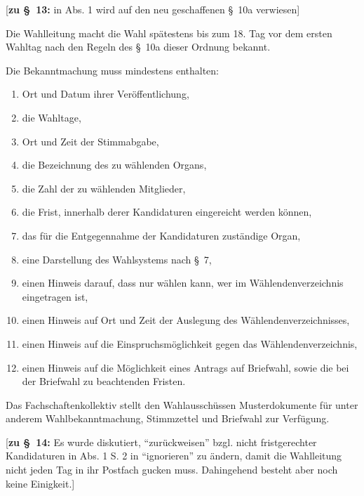 \documentclass[%
draft,%
multilinesections%
]{fswo}
\newcommand\bemFr[1] {{\color{Red}[#1]}}
\newcommand\bemFr[1]{}%
\begin{document}
\bemFr{\textbf{zu \S~13:} in Abs. 1 wird auf den neu geschaffenen \S~10a verwiesen}
\begin{contract}
Die Wahlleitung macht die Wahl spätestens bis zum 18. Tag vor dem ersten Wahltag nach den Regeln des \S~10a dieser Ordnung bekannt.

Die Bekanntmachung muss mindestens enthalten:
\begin{enumerate}
\item Ort und Datum ihrer Veröffentlichung,
\item die Wahltage,
\item Ort und Zeit der Stimmabgabe,
\item die Bezeichnung des zu wählenden Organs,
\item die Zahl der zu wählenden Mitglieder,
\item die Frist, innerhalb derer Kandidaturen eingereicht werden können,
\item das für die Entgegennahme der Kandidaturen zuständige Organ,
\item eine Darstellung des Wahlsystems nach \S~7,
\item einen Hinweis darauf, dass nur wählen kann, wer im Wählendenverzeichnis eingetragen ist,
\item einen Hinweis auf Ort und Zeit der Auslegung des Wählendenverzeichnisses,
\item einen Hinweis auf die Einspruchsmöglichkeit gegen das Wählendenverzeichnis,
\item einen Hinweis auf die Möglichkeit eines Antrags auf Briefwahl, sowie die bei der Briefwahl zu beachtenden Fristen.
\end{enumerate}

Das Fachschaftenkollektiv stellt den Wahlausschüssen Musterdokumente für unter anderem Wahlbekanntmachung, Stimmzettel und Briefwahl zur Verfügung.
\end{contract}

\bemFr{\textbf{zu \S~14:} Es wurde diskutiert, \enquote{zurückweisen} bzgl. nicht fristgerechter Kandidaturen in Abs. 1 S. 2 in \enquote{ignorieren} zu ändern, damit die Wahlleitung nicht jeden Tag in ihr Postfach gucken muss.
Dahingehend besteht aber noch keine Einigkeit.}
\end{document}
